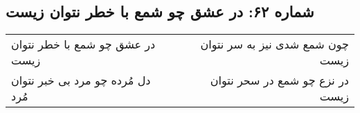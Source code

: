 \begin{center}
\section*{شماره ۶۲: در عشق چو شمع با خطر نتوان زیست}
\label{sec:062}
\begin{longtable}{l p{0.5cm} r}
در عشق چو شمع با خطر نتوان زیست
&&
چون شمع شدی نیز به سر نتوان زیست
\\
دل مُرده چو مرد بی خبر نتوان مُرد
&&
در نزع چو شمع در سحر نتوان زیست
\\
\end{longtable}
\end{center}
